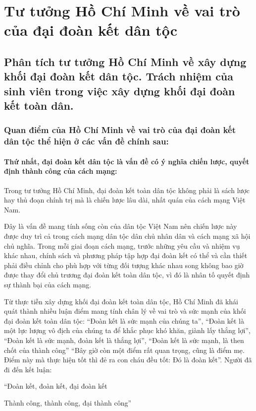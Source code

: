 \section{Tư tưởng Hồ Chí Minh về vai trò của đại đoàn kết dân tộc}

\subsection{Phân tích tư tưởng Hồ Chí Minh về xây dựng khối đại đoàn kết dân tộc. Trách nhiệm của sinh viên trong việc xây dựng khối đại đoàn kết toàn dân.}

\subsubsection{Quan điểm của Hồ Chí Minh về vai trò của đại đoàn kết dân tộc thể hiện ở các vấn đề chính sau:}

\paragraph{Thứ nhất, đại đoàn kết dân tộc là vấn đề có ý nghĩa chiến lược, quyết định thành công của cách mạng:}
Trong tư tưởng Hồ Chí Minh, đại đoàn kết toàn dân tộc không phải là sách lược hay thủ đoạn chính trị mà là chiến lược lâu dài, nhất quán của cách mạng Việt Nam.

Đây là vấn đề mang tính sống còn của dân tộc Việt Nam nên chiến lược này được duy trì cả trong cách mạng dân tộc dân chủ nhân dân và cách mạng xã hội chủ nghĩa. Trong mỗi giai đoạn cách mạng, trước những yêu cầu và nhiệm vụ khác nhau, chính sách và phương pháp tập hợp đại đoàn kết có thể và cần thiết phải điều chỉnh cho phù hợp với từng đối tượng khác nhau song không bao giờ được thay đổi chủ trương đại đoàn kết toàn dân tộc, vì đó là nhân tố quyết định sự thành bại của cách mạng.

Từ thực tiễn xây dựng khối đại đoàn kết toàn dân tộc, Hồ Chí Minh đã khái quát thành nhiều luận điểm mang tính chân lý về vai trò và sức mạnh của khối đại đoàn kết toàn dân tộc: ``Đoàn kết là sức mạnh của chúng ta'', ``Đoàn kết là một lực lượng vô địch của chúng ta để khắc phục khó khăn, giành lấy thắng lợi'', ``Đoàn kết là sức mạnh, đoàn kết là thắng lợi'', ``Đoàn kết là sức mạnh, là then chốt của thành công'' ``Bây giờ còn một điểm rất quan trọng, cũng là điểm mẹ. Điểm này mà thực hiện tốt thì đẻ ra con cháu đều tốt: Đó là đoàn kết''. Người đã đi đến kết luận:
\begin{center}
    ``Đoàn kết, đoàn kết, đại đoàn kết
    
    Thành công, thành công, đại thành công''    
\end{center}

